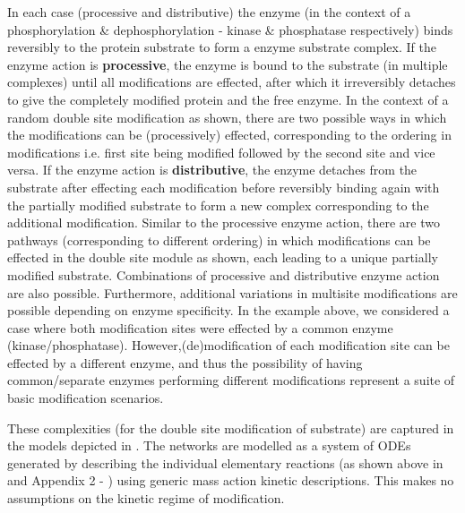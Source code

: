 \documentclass[9pt,lineno]{elife}
\begin{document}
\begin{appendixbox}
In each case (processive and distributive) the enzyme (in the context of a phosphorylation \& dephosphorylation - kinase \& phosphatase respectively) binds reversibly to the protein substrate to form a enzyme substrate complex. If the enzyme action is \textbf{processive}, the enzyme is bound to the substrate (in multiple complexes) until all modifications are effected, after which it irreversibly detaches to give the completely modified protein and the free enzyme. In the context of a random double site modification as shown, there are two possible ways in which the modifications can be (processively) effected, corresponding to the ordering in modifications i.e. first site being modified followed by the second site and vice versa. If the enzyme action is \textbf{distributive}, the enzyme detaches  from the substrate after effecting each modification before reversibly binding again with the partially modified substrate to form a new complex corresponding to the additional modification. Similar to the processive enzyme action, there are two pathways (corresponding to different ordering)  in which modifications can be effected in the double site module as shown, each leading to a unique partially modified substrate. Combinations of processive and distributive enzyme action are also possible.
Furthermore, additional variations in multisite modifications are possible depending on enzyme specificity. In the example above, we considered a case where both modification sites were effected by a common enzyme (kinase/phosphatase). However,(de)modification of each modification site can be effected by a different enzyme, and thus the possibility of having common/separate enzymes performing different modifications
represent a suite of basic modification scenarios.

These complexities (for the double site modification of substrate) are captured in the models depicted in . The networks are modelled as a system of ODEs generated by describing the individual elementary reactions (as shown above in  and Appendix 2 - ) using generic mass action kinetic descriptions. This makes no assumptions on the kinetic regime of modification. 


\end{appendixbox}
\end{document}
